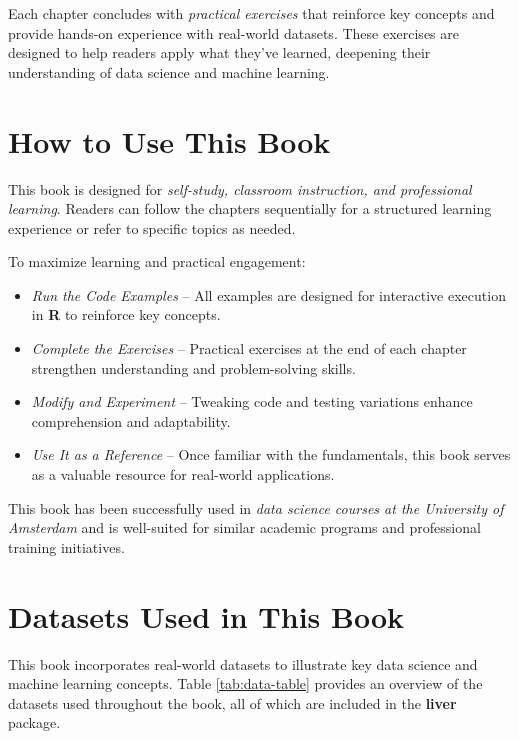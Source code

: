 \documentclass[
  11pt,
]{book}
\providecommand{\tightlist}{%
  \setlength{\itemsep}{0pt}\setlength{\parskip}{0pt}}
\theoremstyle{definition}
\theoremstyle{definition}
\theoremstyle{definition}
\theoremstyle{definition}
\theoremstyle{remark}
\begin{document}
Each chapter concludes with \emph{practical exercises} that reinforce key concepts and provide hands-on experience with real-world datasets. These exercises are designed to help readers apply what they've learned, deepening their understanding of data science and machine learning.

\section*{How to Use This Book}\label{how-to-use-this-book}


This book is designed for \emph{self-study, classroom instruction, and professional learning}. Readers can follow the chapters sequentially for a structured learning experience or refer to specific topics as needed.

To maximize learning and practical engagement:

\begin{itemize}
\tightlist
\item
  \emph{Run the Code Examples} -- All examples are designed for interactive execution in \textbf{R} to reinforce key concepts.\\
\item
  \emph{Complete the Exercises} -- Practical exercises at the end of each chapter strengthen understanding and problem-solving skills.\\
\item
  \emph{Modify and Experiment} -- Tweaking code and testing variations enhance comprehension and adaptability.\\
\item
  \emph{Use It as a Reference} -- Once familiar with the fundamentals, this book serves as a valuable resource for real-world applications.
\end{itemize}

This book has been successfully used in \emph{data science courses at the University of Amsterdam} and is well-suited for similar academic programs and professional training initiatives.

\section*{Datasets Used in This Book}\label{datasets-used-in-this-book}


This book incorporates real-world datasets to illustrate key data science and machine learning concepts. Table \ref{tab:data-table} provides an overview of the datasets used throughout the book, all of which are included in the \textbf{liver} package.
\end{document}
